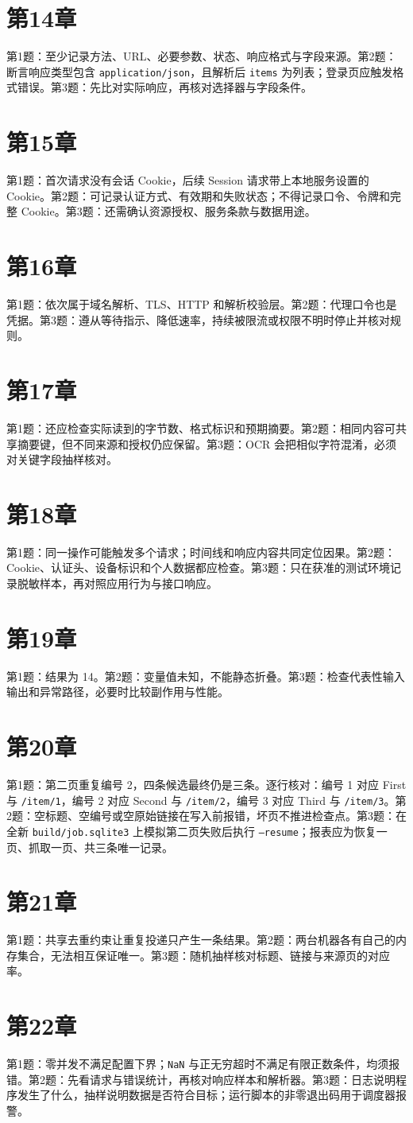 \section*{第14章}
第1题：至少记录方法、URL、必要参数、状态、响应格式与字段来源。第2题：断言响应类型包含 \texttt{application/json}，且解析后 \texttt{items} 为列表；登录页应触发格式错误。第3题：先比对实际响应，再核对选择器与字段条件。

\section*{第15章}
第1题：首次请求没有会话 Cookie，后续 Session 请求带上本地服务设置的 Cookie。第2题：可记录认证方式、有效期和失败状态；不得记录口令、令牌和完整 Cookie。第3题：还需确认资源授权、服务条款与数据用途。

\section*{第16章}
第1题：依次属于域名解析、TLS、HTTP 和解析校验层。第2题：代理口令也是凭据。第3题：遵从等待指示、降低速率，持续被限流或权限不明时停止并核对规则。

\section*{第17章}
第1题：还应检查实际读到的字节数、格式标识和预期摘要。第2题：相同内容可共享摘要键，但不同来源和授权仍应保留。第3题：OCR 会把相似字符混淆，必须对关键字段抽样核对。

\section*{第18章}
第1题：同一操作可能触发多个请求；时间线和响应内容共同定位因果。第2题：Cookie、认证头、设备标识和个人数据都应检查。第3题：只在获准的测试环境记录脱敏样本，再对照应用行为与接口响应。

\section*{第19章}
第1题：结果为 14。第2题：变量值未知，不能静态折叠。第3题：检查代表性输入输出和异常路径，必要时比较副作用与性能。

\section*{第20章}
第1题：第二页重复编号 2，四条候选最终仍是三条。逐行核对：编号 1 对应 First 与 \texttt{/item/1}，编号 2 对应 Second 与 \texttt{/item/2}，编号 3 对应 Third 与 \texttt{/item/3}。第2题：空标题、空编号或空原始链接在写入前报错，坏页不推进检查点。第3题：在全新 \texttt{build/job.sqlite3} 上模拟第二页失败后执行 \texttt{--resume}；报表应为恢复一页、抓取一页、共三条唯一记录。

\section*{第21章}
第1题：共享去重约束让重复投递只产生一条结果。第2题：两台机器各有自己的内存集合，无法相互保证唯一。第3题：随机抽样核对标题、链接与来源页的对应率。

\section*{第22章}
第1题：零并发不满足配置下界；\texttt{NaN} 与正无穷超时不满足有限正数条件，均须报错。第2题：先看请求与错误统计，再核对响应样本和解析器。第3题：日志说明程序发生了什么，抽样说明数据是否符合目标；运行脚本的非零退出码用于调度器报警。
